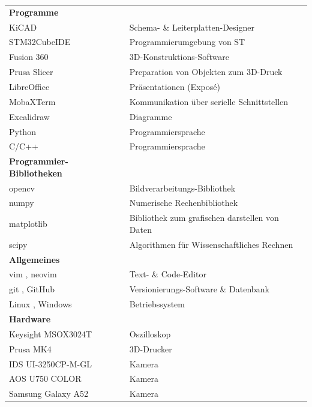 \begin{center}
    \begin{tabular}{ | >{\RaggedRight\hspace{0pt}} l|l | }
        \hline
        \textbf{Programme} & \\
        KiCAD \cite{kicad}                  & Schema- \& Leiterplatten-Designer \\
        STM32CubeIDE \cite{stm32cube}       & Programmierumgebung von ST \\
        Fusion 360 \cite{fusion}            & 3D-Konstruktions-Software \\
        Prusa Slicer \cite{prusa-slicer}    & Preparation von Objekten zum 3D-Druck \\
        LibreOffice \cite{libreoffice}      & Präsentationen (Exposé) \\
        MobaXTerm \cite{mobaxterm}          & Kommunikation über serielle Schnittstellen \\
        Excalidraw \cite{excalidraw}        & Diagramme \\
        Python \cite{python}                & Programmiersprache \\
        C/C++ \cite{cpp}                    & Programmiersprache \\
        \hline
        \textbf{Programmier-Bibliotheken}   & \\
        opencv \cite{opencv}                & Bildverarbeitungs-Bibliothek \\
        numpy \cite{numpy}                  & Numerische Rechenbibliothek \\
        matplotlib \cite{mpl}               & Bibliothek zum grafischen darstellen von Daten \\
        scipy \cite{scipy}                  & Algorithmen für Wissenschaftliches Rechnen \\
        \hline
        \textbf{Allgemeines} & \\
        vim \cite{vim}, neovim \cite{neovim}        & Text- \& Code-Editor \\
        git \cite{git}, GitHub \cite{github}        & Versionierungs-Software \& Datenbank \\
        Linux \cite{linux}, Windows \cite{windows}  & Betriebssystem \\
        \hline
        \textbf{Hardware} & \\
        Keysight MSOX3024T \cite{voltcraft} & Oszilloskop \\
        \hypertarget{hyp:Prusa-MK4}{Prusa MK4} \cite{prusa-mk4} & 3D-Drucker \\
        \hypertarget{hyp:IDS}{IDS} UI-3250CP-M-GL \cite{ids} & Kamera \\
        \hypertarget{hyp:AOS}{AOS} U750 COLOR \cite{aos} & Kamera \\
        Samsung Galaxy \hypertarget{hyp:A52}{A52} \cite{a52} & Kamera \\
        \hline
    \end{tabular}
    \label{table:Tools}
\end{center}

